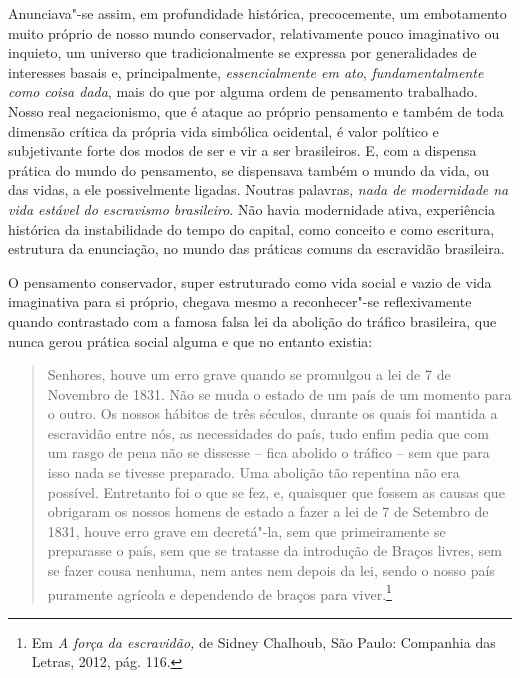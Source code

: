 Anunciava"-se assim, em profundidade histórica, precocemente, um
embotamento muito próprio de nosso mundo conservador, relativamente
pouco imaginativo ou inquieto, um universo que tradicionalmente se
expressa por generalidades de interesses basais e, principalmente,
\emph{essencialmente em ato}, \emph{fundamentalmente} \emph{como}
\emph{coisa dada}, mais do que por alguma ordem de pensamento
trabalhado. Nosso real negacionismo, que é ataque ao próprio pensamento
e também de toda dimensão crítica da própria vida simbólica ocidental, é
valor político e subjetivante forte dos modos de ser e vir a ser
brasileiros. E, com a dispensa prática do mundo do pensamento, se
dispensava também o mundo da vida, ou das vidas, a ele possivelmente
ligadas. Noutras palavras, \emph{nada de modernidade na vida estável do
escravismo brasileiro}. Não havia modernidade ativa, experiência
histórica da instabilidade do tempo do capital, como conceito e como
escritura, estrutura da enunciação, no mundo das práticas comuns da
escravidão brasileira.

O pensamento conservador, super estruturado como vida social e vazio de
vida imaginativa para si próprio, chegava mesmo a reconhecer"-se
reflexivamente quando contrastado com a famosa falsa lei da abolição do
tráfico brasileira, que nunca gerou prática social alguma e que no
entanto existia:

\begin{quote}
Senhores, houve um erro grave quando se promulgou a lei de 7 de
Novembro de 1831. Não se muda o estado de um país de um momento para o
outro. Os nossos hábitos de três séculos, durante os quais foi mantida a
escravidão entre nós, as necessidades do país, tudo enfim pedia que com
um rasgo de pena não se dissesse -- fica abolido o tráfico -- sem que
para isso nada se tivesse preparado. Uma abolição tão repentina não era
possível. Entretanto foi o que se fez, e, quaisquer que fossem as causas
que obrigaram os nossos homens de estado a fazer a lei de 7 de Setembro
de 1831, houve erro grave em decretá"-la, sem que primeiramente se
preparasse o país, sem que se tratasse da introdução de Braços livres,
sem se fazer cousa nenhuma, nem antes nem depois da lei, sendo o nosso
país puramente agrícola e dependendo de braços para viver.\footnote{Em
  \emph{A força da escravidão,} de Sidney Chalhoub, São Paulo: Companhia
  das Letras, 2012, pág. 116.}
\end{quote}

